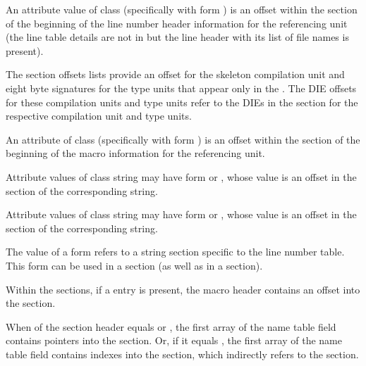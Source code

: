 \begin{description}
An attribute value of class \CLASSlineptr{} (specifically
\DWATstmtlist{}  with form \DWFORMsecoffset)
is an offset within the \dotdebuglinedwo{} section of the
beginning of the line number header information
for the referencing unit (the line table details are not in
\dotdebuglinedwo{} but the line header with its list
of file names is present).

The \dotdebugnames{} section  offsets lists provide an offset
for the skeleton compilation unit and eight
byte signatures for the type units that appear only in the
\dotdebuginfodwo. The DIE offsets for these
compilation units and type units refer to the DIEs in the
\dotdebuginfodwo{} section for the respective
compilation unit and type units.

An attribute of class \CLASSmacptr{} (specifically \DWATmacros{}
with form \DWFORMsecoffset{}) is an offset within the
\dotdebugmacrodwo{} section of the beginning of the macro
information for the referencing unit.

Attribute values of class string may have form \DWFORMstrp{}
\bb
or \DWFORMstrpeight{},
\eb
whose value is an offset in the
\dotdebugstr{} section of the corresponding string.

\bb
Attribute values of class string may have form \DWFORMstrp{}
or \DWFORMstrpeight{}, whose value is an offset in the
\dotdebugstr{} section of the corresponding string.
\eb

\bb
The value of a \DWFORMlinestrp{} form refers to a string section specific
to the line number table. This form can be used in a \dotdebugline{} section
(as well as in a \dotdebuginfo{} section).
\eb

Within the \dotdebugmacrodwo{} sections, if a \DWMACROstartfile{} entry is present,
the macro header contains an offset into the \dotdebuglinedwo{} section.

\bb
When \HFNstrformat{} of the section header equals \DWFORMstrp{}
or \DWFORMstrpeight{}, the first array of the name table
field contains pointers into the \dotdebugstr{} section. Or, 
if it equals \DWFORMstrxfour{}, the first array of the name table
field contains indexes into the \dotdebugstroffsets{} section,
which indirectly refers to the \dotdebugstr{} section.
\eb


\end{description}
